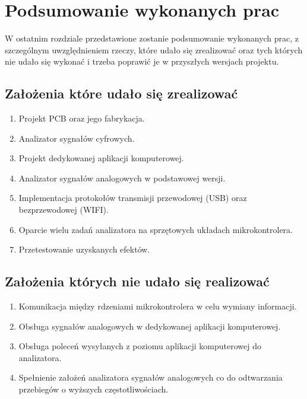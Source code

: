 \section{Podsumowanie wykonanych prac}
W ostatnim rozdziale przedstawione zostanie podsumowanie wykonanych prac, z szczególnym uwzględnieniem rzeczy,
które udało się zrealizować oraz tych których nie udało się wykonać i trzeba poprawić je w przyszłych wersjach projektu.

\subsection{Założenia które udało się zrealizować}
\begin{enumerate}
    \item Projekt PCB oraz jego fabrykacja.
    \item Analizator sygnałów cyfrowych.
    \item Projekt dedykowanej aplikacji komputerowej.
    \item Analizator sygnałów analogowych w podstawowej wersji.
    \item Implementacja protokołów transmisji przewodowej (USB) oraz bezprzewodowej (WIFI).
    \item Oparcie wielu zadań analizatora na sprzętowych układach mikrokontrolera.
    \item Przetestowanie uzyskanych efektów.
\end{enumerate}

\subsection{Założenia których nie udało się realizować}
\begin{enumerate}
    \item Komunikacja między rdzeniami mikrokontrolera w celu wymiany informacji.
    \item Obsługa sygnałów analogowych w dedykowanej aplikacji komputerowej.
    \item Obsługa poleceń wysyłanych z poziomu aplikacji komputerowej do analizatora.
    \item Spełnienie założeń analizatora sygnałów analogowych co do odtwarzania przebiegów o wyższych częstotliwościach.
\end{enumerate}